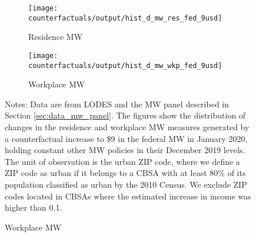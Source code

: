 \begin{figure}[h!]
    \centering
    \caption{Distribution of changes in minimum wage measures under a 
             counterfactual federal minimum wage of \$9, urban ZIP codes}
    \label{fig:cf_hist_res_and_wkp_mw}
    
    \begin{subfigure}{0.5\textwidth}
        \caption*{Residence MW}
        \texttt{[image: counterfactuals/output/hist\_d\_mw\_res\_fed\_9usd]}
    \end{subfigure}%
    \begin{subfigure}{0.5\textwidth}
        \caption*{Workplace MW}
        \texttt{[image: counterfactuals/output/hist\_d\_mw\_wkp\_fed\_9usd]}
    \end{subfigure}

    \begin{minipage}{.95\textwidth} \footnotesize
        \vspace{3mm}
        Notes:
        Data are from LODES and the MW panel described in Section
        \ref{sec:data_mw_panel}.
        The figures show the distribution of changes in the residence and 
        workplace MW measures generated by a counterfactual increase to \$9 
        in the federal MW in January 2020, holding constant other MW policies 
        in their December 2019 levels.
        The unit of observation is the urban ZIP code, where we define a ZIP code 
        as urban if it belongs to a CBSA with at least 80\% of its population 
        classified as urban by the 2010 Census.
        We exclude ZIP codes located in CBSAs where the estimated increase in 
        income was higher than 0.1.
    \end{minipage}
\end{figure}
